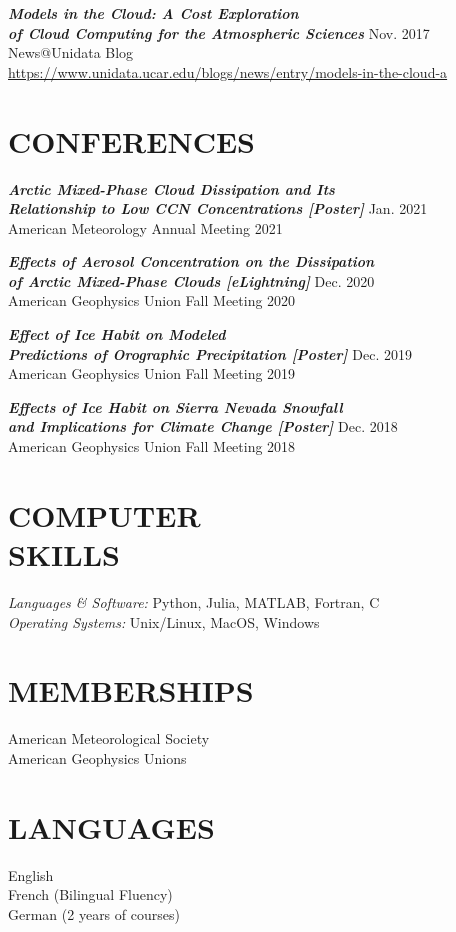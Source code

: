 \documentclass[overlapped]{res}
\begin{document}
\begin{resume}
                
                {\sl \textbf{Models in the Cloud: A Cost Exploration \\ of Cloud Computing for the Atmospheric Sciences}} \hfill Nov. 2017 \\
                News@Unidata Blog \\
                \href{https://www.unidata.ucar.edu/blogs/news/entry/models-in-the-cloud-a}{https://www.unidata.ucar.edu/blogs/news/entry/models-in-the-cloud-a}


\section{CONFERENCES}

                {\sl \textbf{Arctic Mixed-Phase Cloud Dissipation and Its \\ Relationship to Low CCN Concentrations [Poster]}} \hfill Jan. 2021\\
                American Meteorology Annual Meeting 2021

                {\sl \textbf{Effects of Aerosol Concentration  on the Dissipation \\ of Arctic Mixed-Phase Clouds  [eLightning]}} \hfill Dec. 2020 \\
                American Geophysics Union Fall Meeting 2020
                
                {\sl \textbf{Effect of Ice Habit on Modeled \\ Predictions of Orographic Precipitation [Poster]}} \hfill Dec. 2019 \\
                American Geophysics Union Fall Meeting 2019

                {\sl \textbf{Effects of Ice Habit on Sierra Nevada Snowfall \\ and Implications for Climate Change [Poster]}} \hfill Dec. 2018 \\
                American Geophysics Union Fall Meeting 2018
                
                \section{COMPUTER \\ SKILLS} 
                {\sl Languages \& Software:} Python, Julia, MATLAB, Fortran, C \\
                {\sl Operating Systems:} Unix/Linux, MacOS, Windows

\section{MEMBERSHIPS}            
                {American Meteorological Society} \\
                {American Geophysics Unions}

\section{LANGUAGES}
                English \\
                French (Bilingual Fluency) \\
                German (2 years of courses) 

\end{resume}
\end{document}
